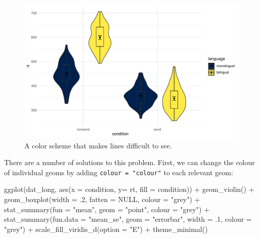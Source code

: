 \documentclass[
  english,
  doc,floatsintext]{apa6}
\newenvironment{Shaded}{\begin{snugshade}}{\end{snugshade}}
\newcommand{\AttributeTok}[1]{\textcolor[rgb]{0.77,0.63,0.00}{#1}}
\newcommand{\ConstantTok}[1]{\textcolor[rgb]{0.00,0.00,0.00}{#1}}
\newcommand{\DecValTok}[1]{\textcolor[rgb]{0.00,0.00,0.81}{#1}}
\newcommand{\FunctionTok}[1]{\textcolor[rgb]{0.00,0.00,0.00}{#1}}
\newcommand{\NormalTok}[1]{#1}
\newcommand{\SpecialCharTok}[1]{\textcolor[rgb]{0.00,0.00,0.00}{#1}}
\newcommand{\StringTok}[1]{\textcolor[rgb]{0.31,0.60,0.02}{#1}}
\begin{document}
\begin{figure}

{\centering \includegraphics[width=1\linewidth]{images/viobox4-1} 

}

\caption{A color scheme that makes lines difficult to see.}\label{fig:viobox4}
\end{figure}

There are a number of solutions to this problem. First, we can change the colour of individual geoms by adding \texttt{colour\ =\ "colour"} to each relevant geom:

\begin{Shaded}
\begin{Highlighting}[]
\FunctionTok{ggplot}\NormalTok{(dat\_long, }\FunctionTok{aes}\NormalTok{(}\AttributeTok{x =}\NormalTok{ condition, }\AttributeTok{y=}\NormalTok{ rt, }\AttributeTok{fill =}\NormalTok{ condition)) }\SpecialCharTok{+}
  \FunctionTok{geom\_violin}\NormalTok{() }\SpecialCharTok{+}
  \FunctionTok{geom\_boxplot}\NormalTok{(}\AttributeTok{width =}\NormalTok{ .}\DecValTok{2}\NormalTok{, }\AttributeTok{fatten =} \ConstantTok{NULL}\NormalTok{, }\AttributeTok{colour =} \StringTok{"grey"}\NormalTok{) }\SpecialCharTok{+}
  \FunctionTok{stat\_summary}\NormalTok{(}\AttributeTok{fun =} \StringTok{"mean"}\NormalTok{, }\AttributeTok{geom =} \StringTok{"point"}\NormalTok{, }\AttributeTok{colour =} \StringTok{"grey"}\NormalTok{) }\SpecialCharTok{+}
  \FunctionTok{stat\_summary}\NormalTok{(}\AttributeTok{fun.data =} \StringTok{"mean\_se"}\NormalTok{, }\AttributeTok{geom =} \StringTok{"errorbar"}\NormalTok{, }\AttributeTok{width =}\NormalTok{ .}\DecValTok{1}\NormalTok{, }\AttributeTok{colour =} \StringTok{"grey"}\NormalTok{) }\SpecialCharTok{+}
  \FunctionTok{scale\_fill\_viridis\_d}\NormalTok{(}\AttributeTok{option =} \StringTok{"E"}\NormalTok{) }\SpecialCharTok{+}
  \FunctionTok{theme\_minimal}\NormalTok{()}
\end{Highlighting}
\end{Shaded}
\end{document}
